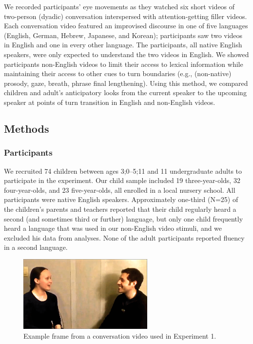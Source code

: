 \documentclass[authoryear, 12pt]{elsarticle}
\begin{document}
We recorded participants' eye movements as they watched six short videos of two-person (dyadic) conversation interspersed with attention-getting filler videos. Each conversation video featured an improvised discourse in one of five languages (English, German, Hebrew, Japanese, and Korean); participants saw two videos in English and one in every other language. The participants, all native English speakers, were only expected to understand the two videos in English. We showed participants non-English videos to limit their access to lexical information while maintaining their access to other cues to turn boundaries (e.g., (non-native) prosody, gaze, breath, phrase final lengthening). Using this method, we compared children and adult's anticipatory looks from the current speaker to the upcoming speaker at points of turn transition in English and non-English videos.

\subsection{Methods}
\label{sec:methods1}

\subsubsection{Participants}

We recruited 74 children between ages 3;0--5;11 and 11 undergraduate adults to participate in the experiment. Our child sample included 19 three-year-olds, 32 four-year-olds, and 23 five-year-olds, all enrolled in a local nursery school. All participants were native English speakers. Approximately one-third (N=25) of the children's parents and teachers reported that their child regularly heard a second (and sometimes third or further) language, but only one child frequently heard a language that was used in our non-English video stimuli, and we excluded his data from analyses. None of the adult participants reported fluency in a second language.

\begin{figure}[t]
\begin{center}
\includegraphics[width=0.6\textwidth]{figures/FIG-FL-stim.png}
\end{center}
\caption{Example frame from a conversation video used in Experiment 1.} 
\label{fig:speakers}
\end{figure}
\end{document}
